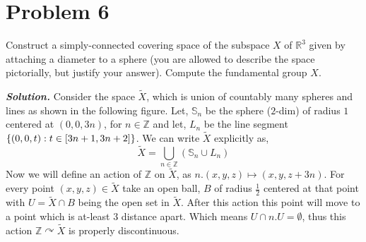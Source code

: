 \documentclass[11pt]{article}
\newcommand{\bb}[1]{\mathbb{#1}}
\newcommand{\Z}{\bb{Z}}
\newcommand{\R}{\mathbb{R}}
\newcommand{\s}{\bb{S}}
\newcommand{\sol}{ \textbf{\textit{Solution.}} }
\begin{document}
\pagebreak 

\section{Problem 6}
\begin{prob}{}{}
    Construct a simply-connected covering space of the subspace $X$ of $\R^3$ given by attaching a diameter to a sphere (you are allowed to describe the space pictorially, but justify your answer). Compute the fundamental group $X$.
\end{prob}
\sol Consider the space $\tilde{X}$, which is union of countably many spheres and lines as shown in the following figure. Let, $\s_n$ be the sphere ($2$-dim) of radius $1$ centered at $(0,0,3n)$, for $n \in \Z$ and let, $L_n$ be the line segment $\qty{(0,0,t) : t \in [3n+1,3n+2]}$. We can write $\tilde{X}$ explicitly as,  $$\tilde{X}= \bigcup_{n \in \Z} (\s_n\cup L_n)$$ 
Now we will define an action of $\Z$ on $\tilde{X}$, as $n.(x,y,z) \mapsto (x,y,z+3n)$. For every point $(x,y,z) \in \tilde{X}$ take an open ball, $B$ of radius $\frac{1}{2}$ centered at that point with $U = \tilde{X} \cap B$ being the open set in $\tilde{X}$. After this action this point will move to a point which is at-least $3$ distance apart. Which means $U \cap n.U =\emptyset$, thus this action $\Z \curvearrowright \tilde{X}$ is properly discontinuous. 
\end{document}

